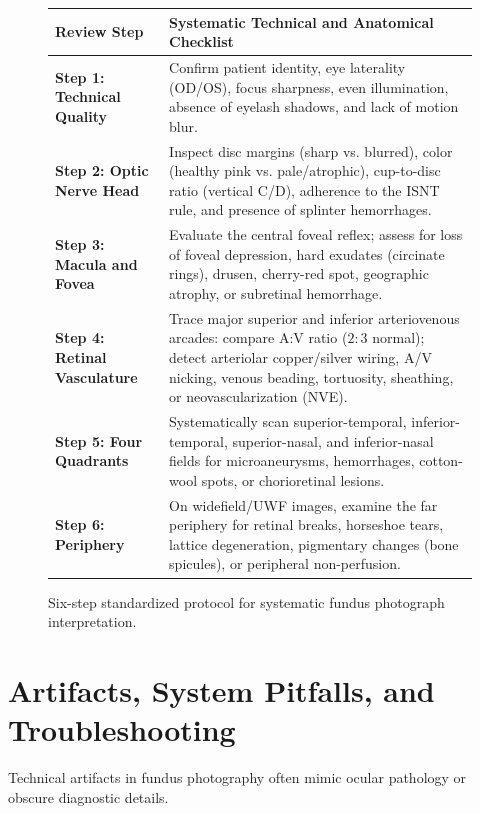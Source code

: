 \documentclass[11pt,a4paper]{article}
\begin{document}
\begin{figure}[htbp]
\centering
\setlength{\tabcolsep}{4pt}
\begin{tabular}{p{4.2cm}p{10.5cm}}
\toprule
\textbf{Review Step} & \textbf{Systematic Technical and Anatomical Checklist} \\
\midrule
\textbf{Step 1: Technical Quality} & Confirm patient identity, eye laterality (OD/OS), focus sharpness, even illumination, absence of eyelash shadows, and lack of motion blur. \\
\addlinespace
\textbf{Step 2: Optic Nerve Head} & Inspect disc margins (sharp vs. blurred), color (healthy pink vs. pale/atrophic), cup-to-disc ratio (vertical C/D), adherence to the ISNT rule, and presence of splinter hemorrhages. \\
\addlinespace
\textbf{Step 3: Macula and Fovea} & Evaluate the central foveal reflex; assess for loss of foveal depression, hard exudates (circinate rings), drusen, cherry-red spot, geographic atrophy, or subretinal hemorrhage. \\
\addlinespace
\textbf{Step 4: Retinal Vasculature} & Trace major superior and inferior arteriovenous arcades: compare A:V ratio ($2:3$ normal); detect arteriolar copper/silver wiring, A/V nicking, venous beading, tortuosity, sheathing, or neovascularization (NVE). \\
\addlinespace
\textbf{Step 5: Four Quadrants} & Systematically scan superior-temporal, inferior-temporal, superior-nasal, and inferior-nasal fields for microaneurysms, hemorrhages, cotton-wool spots, or chorioretinal lesions. \\
\addlinespace
\textbf{Step 6: Periphery} & On widefield/UWF images, examine the far periphery for retinal breaks, horseshoe tears, lattice degeneration, pigmentary changes (bone spicules), or peripheral non-perfusion. \\
\bottomrule
\end{tabular}
\caption{Six-step standardized protocol for systematic fundus photograph interpretation.}
\label{tab:interpretation_protocol}
\end{figure}

\section{Artifacts, System Pitfalls, and Troubleshooting}

Technical artifacts in fundus photography often mimic ocular pathology or obscure diagnostic details.
\end{document}
